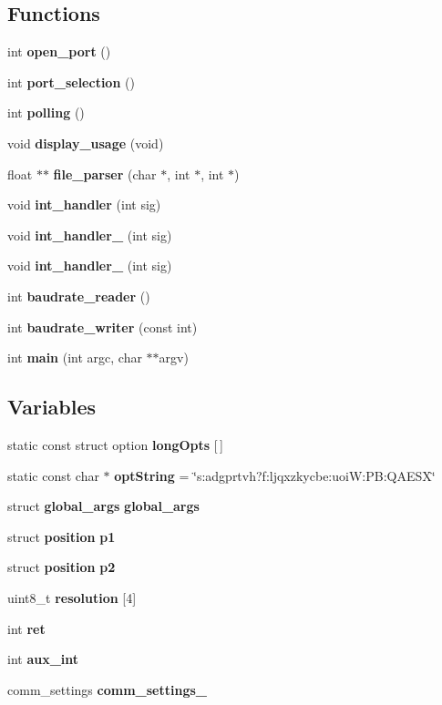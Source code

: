 \subsection*{Functions}
\begin{DoxyCompactItemize}
\item 
\mbox{\label{qbadmin_8c_abe553924eef0ba8079dc745caf1f348c}} 
int {\bfseries open\+\_\+port} ()
\item 
\mbox{\label{qbadmin_8c_a3939d4ef4a0e2be02b1eb9e1994ec985}} 
int {\bfseries port\+\_\+selection} ()
\item 
\mbox{\label{qbadmin_8c_a22b6aac07ec93fb920cc09b13175fa20}} 
int {\bfseries polling} ()
\item 
void \textbf{ display\+\_\+usage} (void)
\item 
float $\ast$$\ast$ \textbf{ file\+\_\+parser} (char $\ast$, int $\ast$, int $\ast$)
\item 
void \textbf{ int\+\_\+handler} (int sig)
\item 
void \textbf{ int\+\_\+handler\+\_} (int sig)
\item 
void \textbf{ int\+\_\+handler\+\_} (int sig)
\item 
int \textbf{ baudrate\+\_\+reader} ()
\item 
\mbox{\label{qbadmin_8c_abab28310fbbbcecb4658ce38e10ae89a}} 
int {\bfseries baudrate\+\_\+writer} (const int)
\item 
int \textbf{ main} (int argc, char $\ast$$\ast$argv)
\end{DoxyCompactItemize}
\subsection*{Variables}
\begin{DoxyCompactItemize}
\item 
\mbox{\label{qbadmin_8c_a091f2d9683d6ef802780b360f66bad67}} 
static const struct option {\bfseries long\+Opts} [$\,$]
\item 
\mbox{\label{qbadmin_8c_a1b7271ddd60c22960c39ae6caf4d5254}} 
static const char $\ast$ {\bfseries opt\+String} = \char`\"{}s\+:adgprtvh?f\+:ljqxzkycbe\+:uoi\+W\+:\+P\+B\+:\+Q\+A\+E\+SX\char`\"{}
\item 
\mbox{\label{qbadmin_8c_ac8e0866643ba994eff3e2fa3203885e0}} 
struct \textbf{ global\+\_\+args} {\bfseries global\+\_\+args}
\item 
\mbox{\label{qbadmin_8c_a821afb7ce4f1050e40bf615da3259a67}} 
struct \textbf{ position} {\bfseries p1}
\item 
\mbox{\label{qbadmin_8c_aeb1c5de60c0abd963c4b508d9f4c3cb1}} 
struct \textbf{ position} {\bfseries p2}
\item 
\mbox{\label{qbadmin_8c_a761d62937db066110a8f3e1479e8c404}} 
uint8\+\_\+t {\bfseries resolution} [4]
\item 
\mbox{\label{qbadmin_8c_a6baa346e44f4c2158d2be4f9b77b8203}} 
int {\bfseries ret}
\item 
\mbox{\label{qbadmin_8c_abf8643fca8c83efc67b50d0f2ecc8534}} 
int {\bfseries aux\+\_\+int}
\item 
\mbox{\label{qbadmin_8c_ae80455d5ff9aa4415b211f9842cb885e}} 
comm\+\_\+settings {\bfseries comm\+\_\+settings\+\_}
\end{DoxyCompactItemize}


